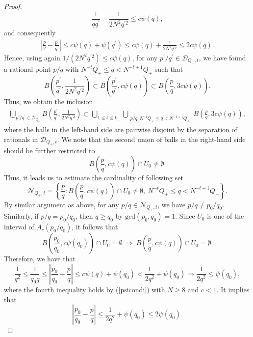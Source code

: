 \documentclass[10pt,a4paper]{amsart}
\begin{document}
\begin{proof}
$$    \frac{1}{qq^{\prime}}-\frac{1}{2N^2q^{\prime2}}
    \le c\psi(q),$$
    and consequently
    \begin{align*}
    \left|\frac{p}{q}-\frac{p^{\prime}}{q^{\prime}}\right|
    \le c\psi(q)+\psi(q^{\prime})
    \le 
    c\psi(q)+\frac{1}{2N^2q^{\prime2}}
    \le 2c\psi(q).
    \end{align*}
    Hence, using again $1/(2N^2q^{\prime2})\le c\psi(q)$, for any $p^{\prime}/q^{\prime}\in\mathcal{D}_{Q_+,t}$, we have found a rational point $p/q$ with $N^{-t} Q_+\le q<N^{-t+1}Q_+$ such that
    $$B\left(\frac{p^{\prime}}{q^{\prime}},\frac{1}{2N^2q^{\prime2}}\right)\subset
    B\left(\frac{p^{\prime}}{q^{\prime}},c\psi(q)\right)
    \subset B\left(\frac{p}{q},3c\psi(q)\right).$$
    Thus, we obtain the inclusion
    \begin{align}\label{result1}
       \bigcup_{p^{\prime}/q^{\prime}\in\mathcal{D}_{Q_+}}B\left(\frac{p^{\prime}}{q^{\prime}},\frac{1}{2N^2q^{\prime2}}\right)\subset \bigcup_{1\le t\le k_-}\bigcup_{\substack{p/q:N^{-t} Q_+\le q<N^{-t+1}Q_+}}B\left(\frac{p}{q},3c\psi(q)\right),
    \end{align}
    where the balls in the left-hand side are pairwise disjoint by the separation of rationals in $\mathcal{D}_{Q_+,t}$. We note that the second union of balls in the right-hand side should be further restricted to
    $$B\left(\frac{p}{q},c\psi(q)\right)\cap U_0\neq\emptyset.$$
    Thus, it leads us to estimate the cardinality of following set
    $$\mathcal{N}_{Q_+,t}=\left\{\frac{p}{q}:B\left(\frac{p}{q},c\psi(q)\right)\cap U_0\neq\emptyset, \ N^{-t}Q_+\le q< N^{-t+1}Q_+\right\}.$$
    By similar argument as above, for any $p/q\in\mathcal{N}_{Q_+,t}$, we have $p/q\neq p_0/q_0.$ Similarly, if $p/q= p_0/q_0$, then $q\ge q_0$ by $\textrm{gcd}(p_0,q_0)=1$. Since $U_0$ is one of the interval of $A_{c}(p_0/q_0)$, it follows that
    $$B\left(\frac{p_0}{q_0},c\psi(q_0)\right)\cap U_0=\emptyset\ \Longrightarrow\ B\left(\frac{p}{q},c\psi(q)\right)\cap U_0=\emptyset.$$
    Therefore, we have that
    $$\frac{1}{q^{2}}\le\frac{1}{q_0q}\le \left|\frac{p_0}{q_0}-\frac{p}{q}\right|\le c\psi(q)+\psi(q_0)<\frac{1}{2q^{2}}+\psi(q_0)\Longrightarrow \frac{1}{2q^{2}}\le \psi(q_0),$$
    where the fourth inequality holds by (\ref{psicondi}) with $N\ge 8$ and $c<1$.
    It implies that
    $$\left|\frac{p_0}{q_0}-\frac{p}{q}\right|\le 
    \frac{1}{2q^{2}}+\psi(q_0)\le 2\psi(q_0).$$

\end{proof}
\end{document}
